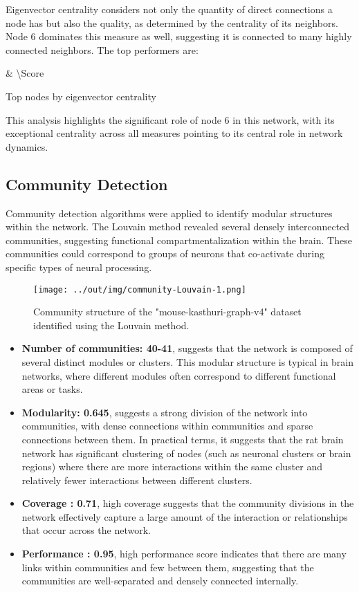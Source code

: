 \documentclass[
	report, %
	11pt, %
]{CSUniSchoolLabReport}
\newcommand{\csvtable}[3]{%
\begin{table}[H]
	\centering
	\csvreader[tabular=|c|c|,
	table head=\hline #3 \\\hline,
	late after line=\\\hline]%
	{#1}{1=\Node, 2=\Score}%
	{\Node & \num{\Score}}
	\caption{#2}
\end{table}
}
\begin{document}
	Eigenvector centrality considers not only the quantity of direct connections a node has but also the quality,
	as determined by the centrality of its neighbors.
	Node 6 dominates this measure as well, suggesting it is connected to many highly connected neighbors. The top performers are:

	\csvtable{../out/data/eigenvector_centrality.csv}{Top nodes by eigenvector centrality}{Node & Eigenvector Score}


	This analysis highlights the significant role of node 6 in this network, with its exceptional centrality across all measures pointing to its central role in network dynamics.


	\subsection{Community Detection}

	Community detection algorithms were applied to identify modular structures within the network. The Louvain method revealed several densely interconnected communities, suggesting functional compartmentalization within the brain. These communities could correspond to groups of neurons that co-activate during specific types of neural processing.

	\begin{figure}[H]
		\centering
		\captionsetup{justification=centering}
		\texttt{[image: ../out/img/community-Louvain-1.png]}
		\caption{Community structure of the "mouse-kasthuri-graph-v4" dataset identified using the Louvain method.}
		\label{fig:community}
	\end{figure}

	\begin{itemize}
		\item \textbf{Number of communities: 40-41}, suggests that the network is composed of several distinct modules or clusters. This modular structure is typical in brain networks, where different modules often correspond to different functional areas or tasks.
		\item \textbf{Modularity: 0.645}, suggests a strong division of the network into communities, with dense connections within communities and sparse connections between them. In practical terms, it suggests that the rat brain network has significant clustering of nodes (such as neuronal clusters or brain regions) where there are more interactions within the same cluster and relatively fewer interactions between different clusters.
		\item \textbf{Coverage : 0.71}, high coverage suggests that the community divisions in the network effectively capture a large amount of the interaction or relationships that occur across the network.
		\item \textbf{Performance : 0.95}, high performance score indicates that there are many links within communities and few between them, suggesting that the communities are well-separated and densely connected internally.
	\end{itemize}
\end{document}
